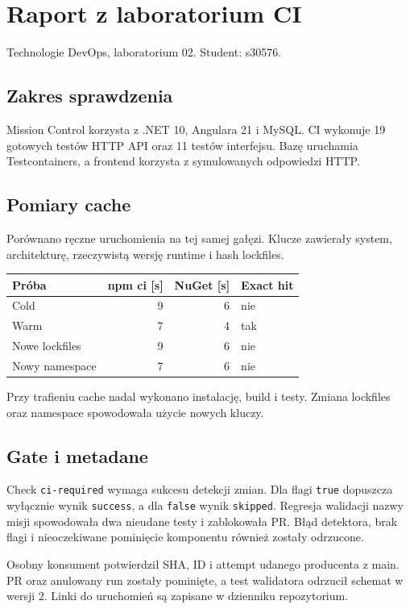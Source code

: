 \documentclass{sprz}
\begin{document}
\chapter*{Raport z laboratorium CI}
Technologie DevOps, laboratorium 02. Student: s30576.

\section*{Zakres sprawdzenia}
Mission Control korzysta z .NET 10, Angulara 21 i MySQL.
CI wykonuje 19 gotowych testów HTTP API oraz 11 testów interfejsu.
Bazę uruchamia Testcontainers, a frontend korzysta z symulowanych odpowiedzi HTTP.

\section*{Pomiary cache}
Porównano ręczne uruchomienia na tej samej gałęzi. Klucze zawierały system,
architekturę, rzeczywistą wersję runtime i hash lockfiles.

\begin{center}
\begin{tabular}{lrrl}
\hline
Próba & npm ci [s] & NuGet [s] & Exact hit \\
\hline
Cold & 9 & 6 & nie \\
Warm & 7 & 4 & tak \\
Nowe lockfiles & 9 & 6 & nie \\
Nowy namespace & 7 & 6 & nie \\
\hline
\end{tabular}
\end{center}
Przy trafieniu cache nadal wykonano instalację, build i testy.
Zmiana lockfiles oraz namespace spowodowała użycie nowych kluczy.

\section*{Gate i metadane}
Check \texttt{ci-required} wymaga sukcesu detekcji zmian. Dla flagi
\texttt{true} dopuszcza wyłącznie wynik \texttt{success}, a dla
\texttt{false} wynik \texttt{skipped}.
Regresja walidacji nazwy misji spowodowała dwa nieudane testy i zablokowała PR.
Błąd detektora, brak flagi i nieoczekiwane pominięcie komponentu również
zostały odrzucone.

Osobny konsument potwierdził SHA, ID i attempt udanego producenta z main.
PR oraz anulowany run zostały pominięte, a test walidatora odrzucił schemat
w wersji 2. Linki do uruchomień są zapisane w dzienniku repozytorium.
\end{document}
